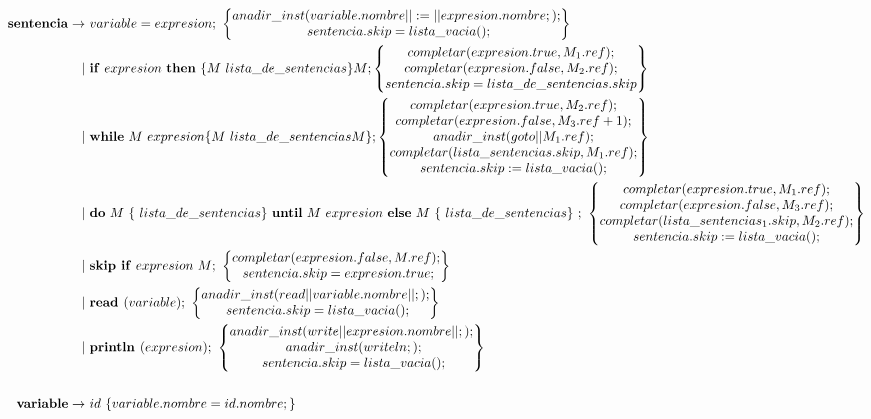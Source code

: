 \documentclass[12pt,a4paper,landscape]{article}
\theoremstyle{mytheor}
\begin{document}
\begin{alignat*}{2}
  \text{\textbf{sentencia}} \to\ & variable = expresion;\ \begin{Bmatrix} anadir\_inst(variable.nombre||:=||expresion.nombre;);\\ sentencia.skip=lista\_vacia();\end{Bmatrix}\\
 |\ &\text{\textbf{if}}\ expresion\ \text{\textbf{then}}\ \{M\ lista\_de\_sentencias\}M; \begin{Bmatrix} completar(expresion.true,M_1.ref); \\ completar(expresion.false,M_2.ref);\\ sentencia.skip=lista\_de\_sentencias.skip \end{Bmatrix} \\
 |\ &\text{\textbf{while}}\ M\ expresion \{M\ lista\_de\_sentencias M\}; \begin{Bmatrix} completar(expresion.true,M_2.ref); \\ completar(expresion.false,M_3.ref+1);\\ anadir\_inst(goto||M_1.ref);\\completar(lista\_sentencias.skip,M_1.ref);\\sentencia.skip:=lista\_vacia(); \end{Bmatrix} \\
 |\ &\text{\textbf{do}}\ M\ \{\ lista\_de\_sentencias \}\ \text{\textbf{until}}\ M\ expresion\ \text{\textbf{else}}\ M\ \{\ lista\_de\_sentencias\}\ ;\ \begin{Bmatrix} completar(expresion.true,M_1.ref); \\ completar(expresion.false,M_3.ref);\\ completar(lista\_sentencias_1.skip,M_2.ref);\\sentencia.skip:=lista\_vacia(); \end{Bmatrix} \\
 |\ &\text{\textbf{skip if}}\ expresion\ M;\ \begin{Bmatrix} completar(expresion.false,M.ref); \\ sentencia.skip =expresion.true; \end{Bmatrix}\\
 |\ &\text{\textbf{read }}(variable);\ \begin{Bmatrix} anadir\_inst(read||variable.nombre||;);\\ sentencia.skip=lista\_vacia();\end{Bmatrix}\\
 |\ &\text{\textbf{println }}(expresion);\  \begin{Bmatrix} anadir\_inst(write||expresion.nombre||;); \\ anadir\_inst(writeln;); \\ sentencia.skip=lista\_vacia(); \end{Bmatrix}\\\\
 \text{\textbf{variable}} \to\ & id\ \{variable.nombre = id.nombre;\}
\end{alignat*}
\end{document}
